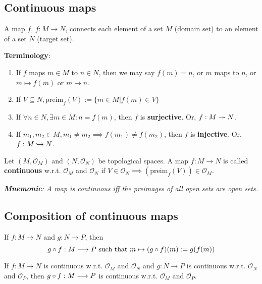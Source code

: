 \subsection{Continuous maps}
A map $f$, $f: M \to N$, connects each element of a set $M$ (domain set) to an element of a set $N$ (target set).

\textbf{Terminology}: 
\begin{enumerate}
\item If $f$ maps $m \in M$ to $n \in N$, then we may say $f(m) = n$, or $m$ maps to $n$, or $m \mapsto f(m)$ or $m \mapsto n$.
\item If $V \subseteq N, \text{preim}_{f}(V) := \lbrace m \in M | f(m) \in V \rbrace$
\item If $\forall n \in N, \exists m \in M : n = f(m)$, then $f$ is \textbf{surjective}. Or, $f : M \twoheadrightarrow N$.
\item If $m_1, m_2 \in M, m_1 \neq m_2 \implies f(m_1) \neq f(m_2)$, then $f$ is \textbf{injective}. Or, $f : M \hookrightarrow N$.
\end{enumerate}

\begin{definition}
  Let $(M , \mathcal{O}_{M})$ and $(N, \mathcal{O}_{N})$ be topological spaces. A map $f: M \to N$ is called \textbf{continuous} w.r.t. $\mathcal{O}_{M}$ and $\mathcal{O}_{N}$ if $V \in \mathcal{O}_{N} \implies (\text{preim}_{f}(V)) \in \mathcal{O}_{M}$.
\end{definition}

\textit{\textbf{Mnemonic}: A map is continuous iff the preimages of all open sets are open sets.}

\subsection{Composition of continuous maps}
\begin{definition}
If $f: M \to N$ and $g: N \to P$, then \\
\begin{equation*}
g \circ f: M \longrightarrow P \text{ such that } m \mapsto (g \circ f)(m) := g(f(m))
\end{equation*}
\end{definition}

\begin{theorem}
If $f: M \to N$ is continuous w.r.t. $\mathcal{O}_{M}$ and $\mathcal{O}_{N}$ and $g: N \to P$ is continuous w.r.t. $\mathcal{O}_{N}$ and $\mathcal{O}_{P}$, then $g \circ f: M \longrightarrow P$ is continuous w.r.t. $\mathcal{O}_{M}$ and $\mathcal{O}_{P}$.
\end{theorem}

